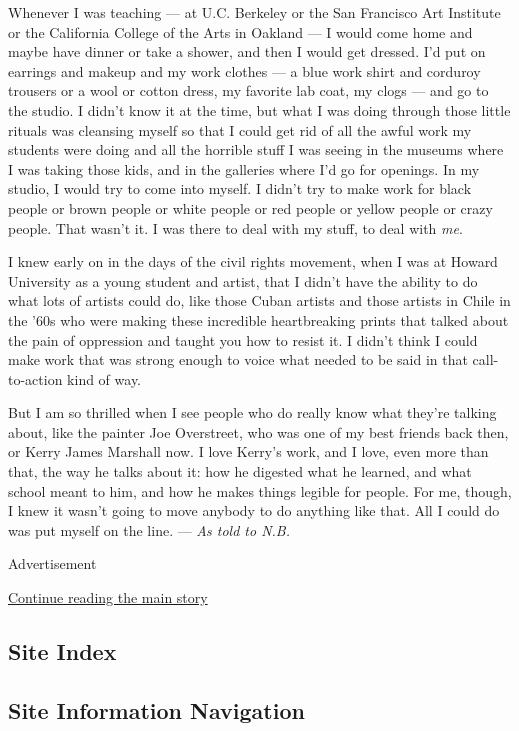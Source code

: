 Whenever I was teaching --- at U.C. Berkeley or the San Francisco Art
Institute or the California College of the Arts in Oakland --- I would
come home and maybe have dinner or take a shower, and then I would get
dressed. I'd put on earrings and makeup and my work clothes --- a blue
work shirt and corduroy trousers or a wool or cotton dress, my favorite
lab coat, my clogs --- and go to the studio. I didn't know it at the
time, but what I was doing through those little rituals was cleansing
myself so that I could get rid of all the awful work my students were
doing and all the horrible stuff I was seeing in the museums where I was
taking those kids, and in the galleries where I'd go for openings. In my
studio, I would try to come into myself. I didn't try to make work for
black people or brown people or white people or red people or yellow
people or crazy people. That wasn't it. I was there to deal with my
stuff, to deal with \emph{me}.

I knew early on in the days of the civil rights movement, when I was at
Howard University as a young student and artist, that I didn't have the
ability to do what lots of artists could do, like those Cuban artists
and those artists in Chile in the '60s who were making these incredible
heartbreaking prints that talked about the pain of oppression and taught
you how to resist it. I didn't think I could make work that was strong
enough to voice what needed to be said in that call-to-action kind of
way.

But I am so thrilled when I see people who do really know what they're
talking about, like the painter Joe Overstreet, who was one of my best
friends back then, or Kerry James Marshall now. I love Kerry's work, and
I love, even more than that, the way he talks about it: how he digested
what he learned, and what school meant to him, and how he makes things
legible for people. For me, though, I knew it wasn't going to move
anybody to do anything like that. All I could do was put myself on the
line. --- \emph{As told to N.B.}

Advertisement

\protect\hyperlink{after-bottom}{Continue reading the main story}

\hypertarget{site-index}{%
\subsection{Site Index}\label{site-index}}

\hypertarget{site-information-navigation}{%
\subsection{Site Information
Navigation}\label{site-information-navigation}}

